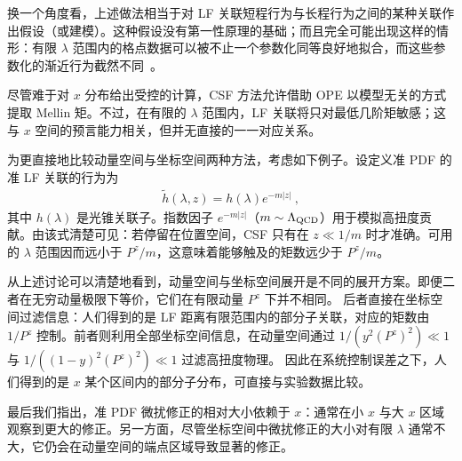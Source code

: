 换一个角度看，上述做法相当于对 LF 关联短程行为与长程行为之间的某种关联作出假设（或建模）。这种假设没有第一性原理的基础；而且完全可能出现这样的情形：有限 $\lambda$ 范围内的格点数据可以被不止一个参数化同等良好地拟合，而这些参数化的渐近行为截然不同~\cite{Sufian:2020vzb}。

尽管难于对 $x$ 分布给出受控的计算，CSF 方法允许借助 OPE 以模型无关的方式提取 Mellin 矩。不过，在有限的 $\lambda$ 范围内，LF 关联将只对最低几阶矩敏感；这与 $x$ 空间的预言能力相关，但并无直接的一一对应关系。

为更直接地比较动量空间与坐标空间两种方法，考虑如下例子。设定义准 PDF 的准 LF 关联的行为为
\begin{align}
\tilde h(\lambda,z)=h(\lambda)e^{-m|z|} \ ,
\end{align}
其中 $h(\lambda)$ 是光锥关联子。指数因子 $e^{-m|z|}$（$m\sim \Lambda_{\rm QCD}$）用于模拟高扭度贡献。由该式清楚可见：若停留在位置空间，CSF 只有在 $z\ll 1/m$ 时才准确。可用的 $\lambda$ 范围因而远小于 $P^z/m$，这意味着能够触及的矩数远少于 $P^z/m$。

从上述讨论可以清楚地看到，动量空间与坐标空间展开是不同的展开方案。即便二者在无穷动量极限下等价，它们在有限动量 $P^z$ 下并不相同。
后者直接在坐标空间过滤信息：人们得到的是 LF 距离有限范围内的部分子关联，对应的矩数由 $1/P^z$ 控制。前者则利用全部坐标空间信息，在动量空间通过 $1/(y^2(P^z)^2)\ll 1$ 与 $1/((1-y)^2(P^z)^2)\ll 1$ 过滤高扭度物理。
因此在系统控制误差之下，人们得到的是 $x$ 某个区间内的部分子分布，可直接与实验数据比较。

最后我们指出，准 PDF 微扰修正的相对大小依赖于 $x$：通常在小 $x$ 与大 $x$ 区域观察到更大的修正。另一方面，尽管坐标空间中微扰修正的大小对有限 $\lambda$ 通常不大，它仍会在动量空间的端点区域导致显著的修正。